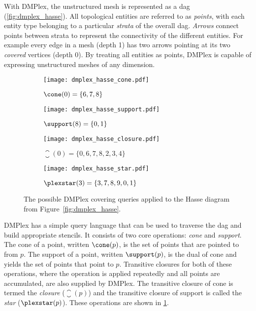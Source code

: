 \documentclass[thesis]{subfiles}
\begin{document}
With DMPlex, the unstructured mesh is represented as a \gls{dag} (\cref{fig:dmplex_hasse}).
All topological entities are referred to as \textit{points}, with each entity type belonging to a particular \textit{strata} of the overall \gls{dag}.
\textit{Arrows} connect points between strata to represent the connectivity of the different entities.
For example every edge in a mesh (depth 1) has two arrows pointing at its two \textit{covered} vertices (depth 0).
By treating all entities as points, DMPlex is capable of expressing unstructured meshes of any dimension.

\begin{figure}
  \centering
  \begin{subfigure}{.49\textwidth}
    \centering
    \texttt{[image: dmplex\_hasse\_cone.pdf]}
    \caption{$\cone(0) = \{6,7,8\}$}
  \end{subfigure}
  \begin{subfigure}{.49\textwidth}
    \centering
    \texttt{[image: dmplex\_hasse\_support.pdf]}
    \caption{$\support(8) = \{0,1\}$}
  \end{subfigure}

  \begin{subfigure}{.49\textwidth}
    \centering
    \texttt{[image: dmplex\_hasse\_closure.pdf]}
    \caption{$\closure(0) = \{0,6,7,8,2,3,4\}$}
  \end{subfigure}
  \begin{subfigure}{.49\textwidth}
    \centering
    \texttt{[image: dmplex\_hasse\_star.pdf]}
    \caption{$\plexstar(3) = \{3,7,8,9,0,1\}$}
  \end{subfigure}

  \caption{
    The possible DMPlex covering queries applied to the Hasse diagram from Figure~\ref{fig:dmplex_hasse}.
  }
  \label{fig:dmplex_queries}
\end{figure}

DMPlex has a simple query language that can be used to traverse the \gls{dag} and build appropriate stencils.
It consists of two core operations: \textit{cone} and \textit{support}.
The cone of a point, written $\cone(p)$, is the set of points that are pointed to from $p$.
The support of a point, written $\support(p)$, is the dual of cone and yields the set of points that point to $p$.
Transitive closures for both of these operations, where the operation is applied repeatedly and all points are accumulated, are also supplied by DMPlex.
The transitive closure of cone is termed the \textit{closure} ($\closure(p)$) and the transitive closure of support is called the \textit{star} ($\plexstar(p)$).
These operations are shown in \cref{fig:dmplex_queries}.
\end{document}
